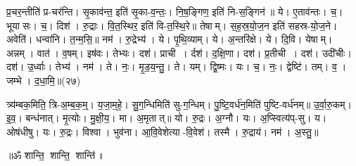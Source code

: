प्र॒चर॒न्तीति॑ प्र-चर॑न्ति। सृ॒काव॑न्त॒ इति॑ सृ॒का-व॒न्तः॒। नि॒ष॒ङ्गिण॒ इति॑ नि-स॒ङ्गिन॑॥ ये। ए॒ताव॑न्तः। च॒। भूयासः। च॒। दिश॑। रु॒द्राः। वि॒त॒स्थिर॒ इति॑ वि-त॒स्थि॒रे॥ तेषाम्। स॒ह॒स्र॒यो॒ज॒न इति॑ सहस्र-यो॒ज॒ने। अवेति॑। धन्वा॑नि। त॒न्म॒सि॒॥ नम॑। रु॒द्रेभ्य॑। ये। पृ॒थि॒व्याम्। ये। अ॒न्तरि॑क्षे। ये। दि॒वि। येषाम्। अन्नम्। वात॑। व॒\ar{}षम्। इष॑वः। तेभ्यः। दश॑। प्राची। र्दश॑। द॒क्षि॒णा। दश॑। प्र॒तीची। दश॑। उदी॑चीः। दश॑। उ॒र्ध्वाः। तेभ्य॑। नम॑। ते। नः॒। मृ॒ड॒य॒न्तु॒। ते। यम्। द्वि॒ष्मः। यः। च॒। नः॒। द्वेष्टि॑। तम्। व॒। जम्भे। द॒धा॒मि॒॥(२७)

त्र्य॑म्बक॒मिति॒ त्रि-अ॒म्ब॒क॒म्॒। य॒जा॒म॒हे॒। सु॒ग॒न्धिमिति॑ सु-ग॒न्धिम्। पु॒ष्टि॒वर्ध॑न॒मिति॑ पुष्टि-वर्ध॑नम्॥ उ॒र्वा॒रु॒कम्। इ॒व॒। बन्ध॑नात्। मृ॒त्योः। मु॒क्षी॒य॒। मा। अ॒मृतात्॥ यो। रु॒द्रः। अ॒ग्नौ। यः। अ॒प्स्वित्य॑प्-सु। य। ओष॑धीषु। यः। रु॒द्रः। विश्वा। भुव॑ना। आ॒वि॒वेशेत्या-वि॒वेश॑। तस्मै। रु॒द्राय॑। नम॑। अ॒स्तु॒॥

\centerline{॥ॐ शान्ति॒ शान्ति॒ शान्ति॑॥}



